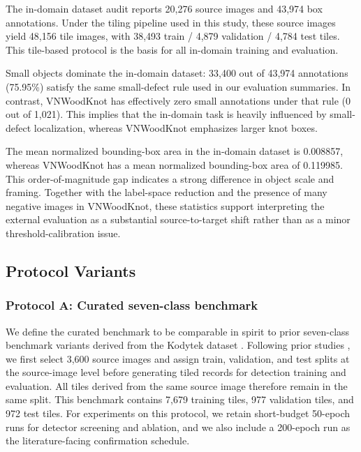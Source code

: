 \documentclass[10pt,a4paper]{article}
\begin{document}
The in-domain dataset audit reports 20,276 source images and 43,974 box annotations. Under the tiling pipeline used in this study, these source images yield 48,156 tile images, with 38,493 train / 4,879 validation / 4,784 test tiles. This tile-based protocol is the basis for all in-domain training and evaluation.

Small objects dominate the in-domain dataset: 33,400 out of 43,974 annotations (75.95\%) satisfy the same small-defect rule used in our evaluation summaries. In contrast, VNWoodKnot has effectively zero small annotations under that rule (0 out of 1,021). This implies that the in-domain task is heavily influenced by small-defect localization, whereas VNWoodKnot emphasizes larger knot boxes.

The mean normalized bounding-box area in the in-domain dataset is 0.008857, whereas VNWoodKnot has a mean normalized bounding-box area of 0.119985. This order-of-magnitude gap indicates a strong difference in object scale and framing. Together with the label-space reduction and the presence of many negative images in VNWoodKnot, these statistics support interpreting the external evaluation as a substantial source-to-target shift rather than as a minor threshold-calibration issue.

\subsection{Protocol Variants}
\label{sec:protocol}

\subsubsection{Protocol A: Curated seven-class benchmark}
We define the curated benchmark to be comparable in spirit to prior seven-class benchmark variants derived from the Kodytek dataset \citep{kodytek_dataset}. Following prior studies \citep{odca_yolo,bpn_yolo,sim_yolo,fdd_yolo,an_cwb_yolov8}, we first select 3,600 source images and assign train, validation, and test splits at the source-image level before generating tiled records for detection training and evaluation. All tiles derived from the same source image therefore remain in the same split. This benchmark contains 7,679 training tiles, 977 validation tiles, and 972 test tiles. For experiments on this protocol, we retain short-budget 50-epoch runs for detector screening and ablation, and we also include a 200-epoch run as the literature-facing confirmation schedule.
\end{document}
